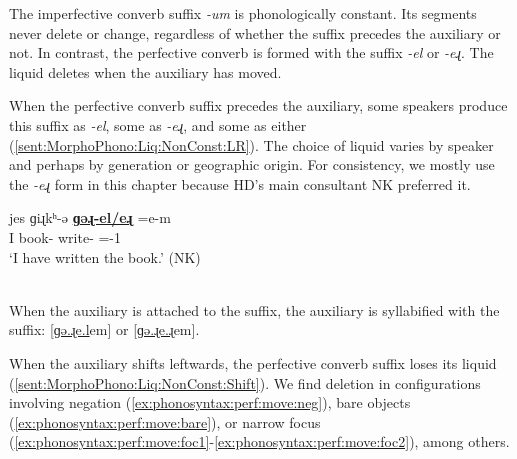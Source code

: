 The imperfective converb suffix \textit{-um}  is phonologically constant. Its segments never delete or change, regardless of whether the suffix precedes the auxiliary or not.  	In contrast, the  perfective converb is formed with the suffix \textit{-el} or \textit{-eɻ}. The liquid deletes when the auxiliary has moved. 

When the perfective converb suffix precedes the auxiliary, some speakers produce this suffix as \textit{-el}, some as \textit{-eɻ}, and some as either (\ref{sent:MorphoPhono:Liq:NonConst:LR}). The choice of liquid varies by speaker and perhaps by  generation or geographic origin. For consistency, we mostly use the \textit{-eɻ} form in this chapter because HD's main consultant NK preferred it. 

\begin{exe}
	\ex \gll jes  ɡiɻkʰ-ə  \uline{\textbf{ɡəɻ-el/eɻ}}  \colorbox{lsLightGray}{=e-m}
	\\
	I  book-{}  write-{\perfcvb}  ={\auxgloss}-1{\sg}
	\\
	\trans `I have written the book.' \hfill (NK) \label{sent:MorphoPhono:Liq:NonConst:LR}
	\\
	\\
\end{exe}

When the auxiliary is attached to the suffix, the auxiliary is syllabified with the suffix:   [{\uline{ɡə.ɻe.l}em}]  or    [{\uline{ɡə.ɻe.ɻ}em}]. 

When the auxiliary shifts leftwards, the perfective converb suffix loses its liquid (\ref{sent:MorphoPhono:Liq:NonConst:Shift}). We find deletion in   configurations involving   negation (\ref{ex:phonosyntax:perf:move:neg}), bare objects (\ref{ex:phonosyntax:perf:move:bare}), or narrow focus (\ref{ex:phonosyntax:perf:move:foc1}-\ref{ex:phonosyntax:perf:move:foc2}),  among  others.  

